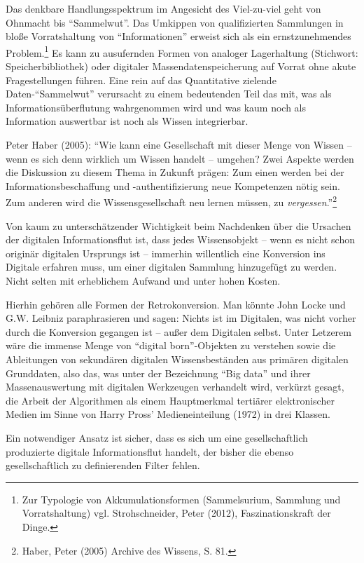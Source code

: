 \documentclass[a4paper,
fontsize=11pt,
oneside,
numbers=noperiodatend,
parskip=half-,
bibliography=totoc,
final
]{scrartcl}
\begin{document}
Das denkbare Handlungsspektrum im Angesicht des Viel-zu-viel geht von
Ohnmacht bis \enquote{Sammelwut}. Das Umkippen von qualifizierten
Sammlungen in bloße Vorratshaltung von \enquote{Informationen} erweist
sich als ein ernstzunehmendes Problem.\footnote{Zur Typologie von
  Akkumulationsformen (Sammelsurium, Sammlung und Vorratshaltung) vgl.
  Strohschneider, Peter (2012), Faszinationskraft der Dinge.} Es kann zu
ausufernden Formen von analoger Lagerhaltung (Stichwort:
Speicherbibliothek) oder digitaler Massendatenspeicherung auf Vorrat
ohne akute Fragestellungen führen. Eine rein auf das Quantitative
zielende Daten-\enquote{Sammelwut} verursacht zu einem bedeutenden Teil
das mit, was als Informationsüberflutung wahrgenommen wird und was kaum
noch als Information auswertbar ist noch als Wissen integrierbar.

Peter Haber (2005): \enquote{Wie kann eine Gesellschaft mit dieser Menge
von Wissen -- wenn es sich denn wirklich um Wissen handelt -- umgehen?
Zwei Aspekte werden die Diskussion zu diesem Thema in Zukunft prägen:
Zum einen werden bei der Informationsbeschaffung und -authentifizierung
neue Kompetenzen nötig sein. Zum anderen wird die Wissensgesellschaft
neu lernen müssen, zu \emph{vergessen}.}\footnote{Haber, Peter (2005)
  Archive des Wissens, S. 81.}

Von kaum zu unterschätzender Wichtigkeit beim Nachdenken über die
Ursachen der digitalen Informationsflut ist, dass jedes Wissensobjekt --
wenn es nicht schon originär digitalen Ursprungs ist -- immerhin
willentlich eine Konversion ins Digitale erfahren muss, um einer
digitalen Sammlung hinzugefügt zu werden. Nicht selten mit erheblichem
Aufwand und unter hohen Kosten.

Hierhin gehören alle Formen der Retrokonversion. Man könnte John Locke
und G.W. Leibniz paraphrasieren und sagen: Nichts ist im Digitalen, was
nicht vorher durch die Konversion gegangen ist -- außer dem Digitalen
selbst. Unter Letzerem wäre die immense Menge von \enquote{digital
born}-Objekten zu verstehen sowie die Ableitungen von sekundären
digitalen Wissensbeständen aus primären digitalen Grunddaten, also das,
was unter der Bezeichnung \enquote{Big data} und ihrer Massenauswertung
mit digitalen Werkzeugen verhandelt wird, verkürzt gesagt, die Arbeit
der Algorithmen als einem Hauptmerkmal tertiärer elektronischer Medien
im Sinne von Harry Pross' Medieneinteilung (1972) in drei Klassen.

Ein notwendiger Ansatz ist sicher, dass es sich um eine gesellschaftlich
produzierte digitale Informationsflut handelt, der bisher die ebenso
gesellschaftlich zu definierenden Filter fehlen.
\end{document}
